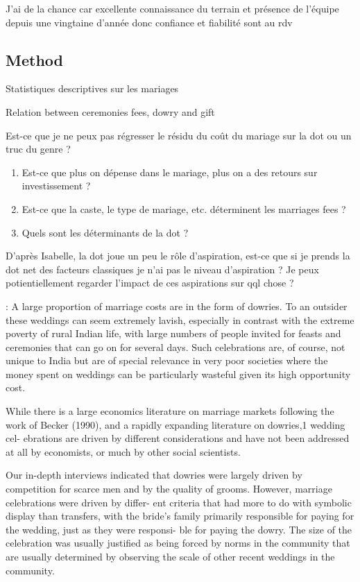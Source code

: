 \documentclass[a4paper, 11pt, onecolumn]{article}
\begin{document}
J'ai de la chance car excellente connaissance du terrain et présence de l'équipe depuis une vingtaine d'année donc confiance et fiabilité sont au rdv


\subsection{Method}

Statistiques descriptives sur les mariages

Relation between ceremonies fees, dowry and gift

Est-ce que je ne peux pas régresser le résidu du coût du mariage sur la dot ou un truc du genre ?

\begin{enumerate}
\item Est-ce que plus on dépense dans le mariage, plus on a des retours sur investissement ?
\item Est-ce que la caste, le type de mariage, etc. déterminent les marriages fees ?
\item Quels sont les déterminants de la dot ?
\end{enumerate}

D'après Isabelle, la dot joue un peu le rôle d'aspiration, est-ce que si je prends la dot net des facteurs classiques je n'ai pas le niveau d'aspiration ?
Je peux potientiellement regarder l'impact de ces aspirations sur qql chose ?






\cite{Bloch2004} : 
A large proportion of marriage costs are in the form of dowries.
To an outsider these weddings can seem extremely lavish, especially in contrast
with the extreme poverty of rural Indian life, with large numbers of people invited for
feasts and ceremonies that can go on for several days. Such celebrations are, of
course, not unique to India but are of special relevance in very poor societies where
the money spent on weddings can be particularly wasteful given its high opportunity
cost. 


While there is a large economics literature on marriage markets following the
work of Becker (1990), and a rapidly expanding literature on dowries,1 wedding cel-
ebrations are driven by different considerations and have not been addressed at all by
economists, or much by other social scientists.

 Our in-depth
interviews indicated that dowries were largely driven by competition for scarce men
and by the quality of grooms. However, marriage celebrations were driven by differ-
ent criteria that had more to do with symbolic display than transfers, with the bride's
family primarily responsible for paying for the wedding, just as they were responsi-
ble for paying the dowry. The size of the celebration was usually justified as being
forced by norms in the community that are usually determined by observing the scale
of other recent weddings in the community.
\end{document}
